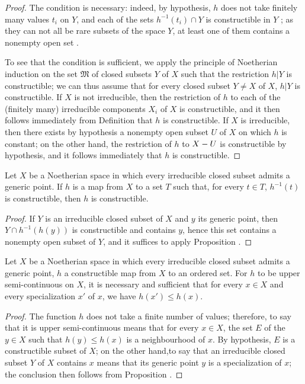 \begin{proof}
The condition is necessary: indeed, by hypothesis, $h$ does not take finitely many values $t_i$ on $Y$, and each of the sets $h^{-1}(t_i)\cap Y$ is constructible in $Y$ ; as they can not all be rare subsets of the space $Y$, at least one of them contains a nonempty open set .

To see that the condition is sufficient, we apply the principle of Noetherian induction on the set $\mathfrak{M}$ of closed subsets $Y$ of $X$ such that the restriction $h|Y$ is constructible; we can thus assume that for every closed subset $Y\neq X$ of $X$,
$h|Y$ is constructible.
If $X$ is not irreducible, then the restriction of $h$ to each of the (finitely many) irreducible components $X_i$ of $X$ is constructible, and it then follows immediately from Definition  that $h$ is constructible.
If $X$ is irreducible, then there exists by hypothesis a nonempty open subset $U$ of $X$ on which $h$ is constant; on the other hand, the restriction of $h$ to $X- U$ is constructible by hypothesis, and it follows immediately that $h$ is constructible.
\end{proof}

\begin{corollary}[9.3.3]
\label{0.9.3.3}
Let $X$ be a Noetherian space in which every irreducible closed subset admits a generic point.
If $h$ is a map from $X$ to a set $T$ such that, for every $t\in T$, $h^{-1}(t)$ is constructible, then $h$ is constructible.
\end{corollary}

\begin{proof}
If $Y$ is an irreducible closed subset of $X$ and $y$ its generic point, then $Y\cap h^{-1}(h(y))$ is constructible and contains $y$, hence  this set contains a nonempty open subset of $Y$, and it suffices to apply Proposition .
\end{proof}

\begin{proposition}[9.3.4]
\label{0.9.3.4}
Let $X$ be a Noetherian space in which every irreducible closed subset admits a generic point, $h$ a constructible map from $X$ to an ordered set.
For $h$ to be upper semi-continuous on $X$, it is necessary and sufficient that for every $x\in X$ and every specialization  $x'$ of $x$, we have $h(x')\leq h(x)$.
\end{proposition}

\begin{proof}
The function $h$ does not take a finite number of values; therefore, to say that it is upper semi-continuous means that for every $x\in X$, the set $E$ of the $y\in X$ such that $h(y)\leq h(x)$ is a neighbourhood of $x$.
By hypothesis, $E$ is a constructible subset of $X$; on the other hand,to say that an irreducible closed subset $Y$ of $X$ contains $x$ means that its generic point $y$ is a specialization of $x$; the conclusion then follows from Proposition .
\end{proof}
